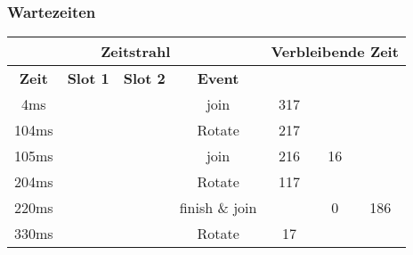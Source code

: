 \begin{frame}
    \frametitle{Wartezeiten}

    \begin{table}[]
        \begin{adjustbox}{width=0.8\textwidth}
            \begin{tabular}{c|cc|c|ccc}
                \multicolumn{4}{c}{\textbf{Zeitstrahl}} & \multicolumn{3}{|c}{\textbf{Verbleibende Zeit}}                                                                                                                                  \\ \hline
                \textbf{Zeit}                           & \textbf{Slot 1}                                 & \textbf{Slot 2} & \textbf{Event}                 & \multicolumn{1}{l}{\textbf{\PZero{}}} & \textbf{\POne{}} & \textbf{\PTwo{}} \\ \hline
                4ms                                     & \PZero{}                                        &                 & \PZero{} join                  & \alert{317}                           &                  &                  \\
                104ms                                   & \PZero{}                                        &                 & \alert{Rotate}                 & \alert{217}                           &                  &                  \\
                105ms                                   & \PZero{}                                        & \POne{}         & \POne{} join                   & \alert{216}                           & 16               &                  \\
                204ms                                   & \POne{}                                         & \PZero{}        & \alert{Rotate}                 & \alert{117}                           &                  &                  \\
                220ms                                   & \PZero{}                                        & \PTwo{}         & \POne{} finish \& \PTwo{} join &                                       & \alert{0}        & 186              \\
                330ms                                   & \PTwo{}                                         & \PZero{}        & \alert{Rotate}                 & \alert{17}                            &                  &                  \\

\end{tabular}
\end{adjustbox}
\end{table}
\end{frame}
